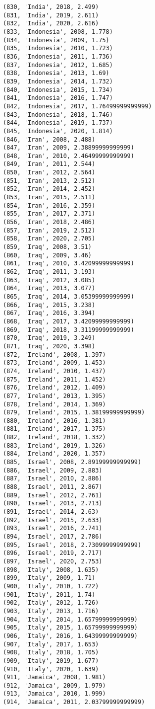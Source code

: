\documentclass[11pt]{article}
\begin{document}
\begin{Verbatim}[commandchars=\\\{\}]
(830, 'India', 2018, 2.499)
(831, 'India', 2019, 2.611)
(832, 'India', 2020, 2.616)
(833, 'Indonesia', 2008, 1.778)
(834, 'Indonesia', 2009, 1.75)
(835, 'Indonesia', 2010, 1.723)
(836, 'Indonesia', 2011, 1.736)
(837, 'Indonesia', 2012, 1.685)
(838, 'Indonesia', 2013, 1.69)
(839, 'Indonesia', 2014, 1.732)
(840, 'Indonesia', 2015, 1.734)
(841, 'Indonesia', 2016, 1.747)
(842, 'Indonesia', 2017, 1.76499999999999)
(843, 'Indonesia', 2018, 1.746)
(844, 'Indonesia', 2019, 1.737)
(845, 'Indonesia', 2020, 1.814)
(846, 'Iran', 2008, 2.488)
(847, 'Iran', 2009, 2.38899999999999)
(848, 'Iran', 2010, 2.46499999999999)
(849, 'Iran', 2011, 2.544)
(850, 'Iran', 2012, 2.564)
(851, 'Iran', 2013, 2.512)
(852, 'Iran', 2014, 2.452)
(853, 'Iran', 2015, 2.511)
(854, 'Iran', 2016, 2.359)
(855, 'Iran', 2017, 2.371)
(856, 'Iran', 2018, 2.486)
(857, 'Iran', 2019, 2.512)
(858, 'Iran', 2020, 2.705)
(859, 'Iraq', 2008, 3.51)
(860, 'Iraq', 2009, 3.46)
(861, 'Iraq', 2010, 3.42099999999999)
(862, 'Iraq', 2011, 3.193)
(863, 'Iraq', 2012, 3.085)
(864, 'Iraq', 2013, 3.077)
(865, 'Iraq', 2014, 3.05399999999999)
(866, 'Iraq', 2015, 3.238)
(867, 'Iraq', 2016, 3.394)
(868, 'Iraq', 2017, 3.42099999999999)
(869, 'Iraq', 2018, 3.31199999999999)
(870, 'Iraq', 2019, 3.249)
(871, 'Iraq', 2020, 3.398)
(872, 'Ireland', 2008, 1.397)
(873, 'Ireland', 2009, 1.453)
(874, 'Ireland', 2010, 1.437)
(875, 'Ireland', 2011, 1.452)
(876, 'Ireland', 2012, 1.409)
(877, 'Ireland', 2013, 1.395)
(878, 'Ireland', 2014, 1.369)
(879, 'Ireland', 2015, 1.38199999999999)
(880, 'Ireland', 2016, 1.381)
(881, 'Ireland', 2017, 1.375)
(882, 'Ireland', 2018, 1.332)
(883, 'Ireland', 2019, 1.326)
(884, 'Ireland', 2020, 1.357)
(885, 'Israel', 2008, 2.89199999999999)
(886, 'Israel', 2009, 2.883)
(887, 'Israel', 2010, 2.886)
(888, 'Israel', 2011, 2.867)
(889, 'Israel', 2012, 2.761)
(890, 'Israel', 2013, 2.713)
(891, 'Israel', 2014, 2.63)
(892, 'Israel', 2015, 2.633)
(893, 'Israel', 2016, 2.741)
(894, 'Israel', 2017, 2.786)
(895, 'Israel', 2018, 2.73099999999999)
(896, 'Israel', 2019, 2.717)
(897, 'Israel', 2020, 2.753)
(898, 'Italy', 2008, 1.635)
(899, 'Italy', 2009, 1.71)
(900, 'Italy', 2010, 1.722)
(901, 'Italy', 2011, 1.74)
(902, 'Italy', 2012, 1.726)
(903, 'Italy', 2013, 1.716)
(904, 'Italy', 2014, 1.65799999999999)
(905, 'Italy', 2015, 1.65799999999999)
(906, 'Italy', 2016, 1.64399999999999)
(907, 'Italy', 2017, 1.653)
(908, 'Italy', 2018, 1.705)
(909, 'Italy', 2019, 1.677)
(910, 'Italy', 2020, 1.639)
(911, 'Jamaica', 2008, 1.981)
(912, 'Jamaica', 2009, 1.979)
(913, 'Jamaica', 2010, 1.999)
(914, 'Jamaica', 2011, 2.03799999999999)

\end{Verbatim}
\end{document}

